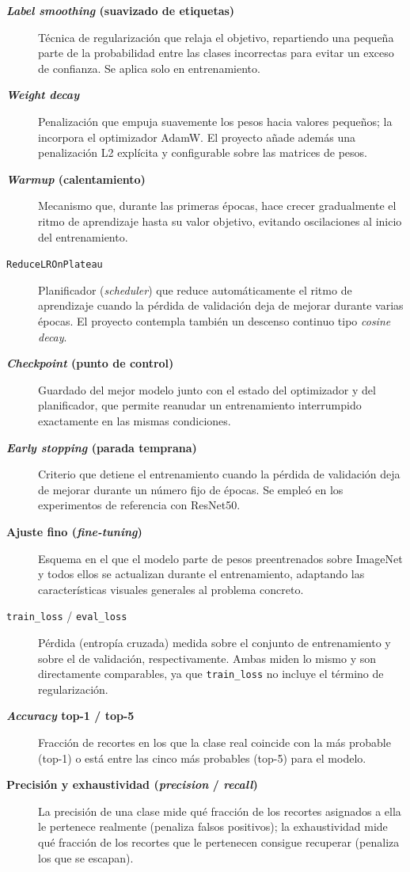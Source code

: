 \begin{description}
  \item[\textbf{\textit{Label smoothing} (suavizado de etiquetas)}] Técnica de regularización que relaja el objetivo, repartiendo una pequeña parte de la probabilidad entre las clases incorrectas para evitar un exceso de confianza. Se aplica solo en entrenamiento.
  \item[\textbf{\textit{Weight decay}}] Penalización que empuja suavemente los pesos hacia valores pequeños; la incorpora el optimizador AdamW. El proyecto añade además una penalización L2 explícita y configurable sobre las matrices de pesos.
  \item[\textbf{\textit{Warmup} (calentamiento)}] Mecanismo que, durante las primeras épocas, hace crecer gradualmente el ritmo de aprendizaje hasta su valor objetivo, evitando oscilaciones al inicio del entrenamiento.
  \item[\texttt{ReduceLROnPlateau}] Planificador (\textit{scheduler}) que reduce automáticamente el ritmo de aprendizaje cuando la pérdida de validación deja de mejorar durante varias épocas. El proyecto contempla también un descenso continuo tipo \textit{cosine decay}.
  \item[\textbf{\textit{Checkpoint} (punto de control)}] Guardado del mejor modelo junto con el estado del optimizador y del planificador, que permite reanudar un entrenamiento interrumpido exactamente en las mismas condiciones.
  \item[\textbf{\textit{Early stopping} (parada temprana)}] Criterio que detiene el entrenamiento cuando la pérdida de validación deja de mejorar durante un número fijo de épocas. Se empleó en los experimentos de referencia con ResNet50.
  \item[\textbf{Ajuste fino (\textit{fine-tuning})}] Esquema en el que el modelo parte de pesos preentrenados sobre ImageNet y todos ellos se actualizan durante el entrenamiento, adaptando las características visuales generales al problema concreto.
  \item[\texttt{train\_loss} / \texttt{eval\_loss}] Pérdida (entropía cruzada) medida sobre el conjunto de entrenamiento y sobre el de validación, respectivamente. Ambas miden lo mismo y son directamente comparables, ya que \texttt{train\_loss} no incluye el término de regularización.
  \item[\textbf{\textit{Accuracy} top-1 / top-5}] Fracción de recortes en los que la clase real coincide con la más probable (top-1) o está entre las cinco más probables (top-5) para el modelo.
  \item[\textbf{Precisión y exhaustividad (\textit{precision} / \textit{recall})}] La precisión de una clase mide qué fracción de los recortes asignados a ella le pertenece realmente (penaliza falsos positivos); la exhaustividad mide qué fracción de los recortes que le pertenecen consigue recuperar (penaliza los que se escapan).

\end{description}
